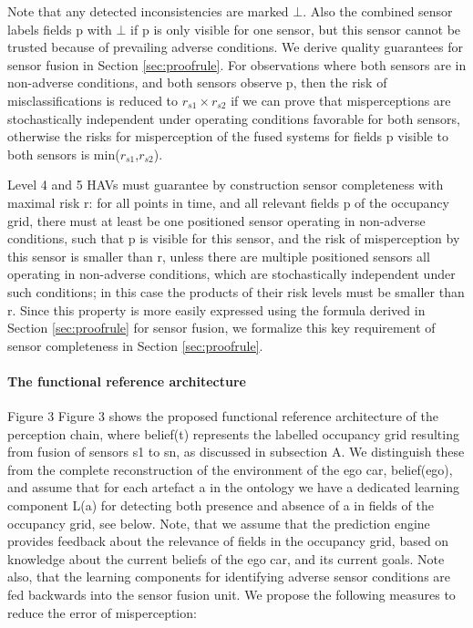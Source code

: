 Note that any detected inconsistencies are marked $\bot$. Also the combined sensor labels fields p with $\bot$ if p is only visible for one sensor, but this sensor cannot be trusted because of prevailing adverse conditions. We derive quality guarantees for sensor fusion in Section \ref{sec:proofrule}. For observations where both sensors are in non-adverse conditions, and both sensors observe p, then the risk of misclassifications is reduced to $r_{s1} \times r_{s2}$ if we can prove that misperceptions are stochastically independent under operating conditions favorable for both sensors, otherwise the risks for misperception of the fused systems for fields p visible to both sensors is min($r_{s1}$,$r_{s2}$).

Level 4 and 5 HAVs must guarantee by construction sensor completeness with maximal risk r: for all points in time, and all relevant fields p of the occupancy grid, there must at least be one positioned sensor operating in non-adverse conditions, such that p is visible for this sensor, and the risk of misperception by this sensor is smaller than r, unless there are multiple positioned sensors all operating in non-adverse conditions, which are stochastically independent under such conditions; in this case the products of their risk levels must be smaller than r. Since this property is more easily expressed using the formula derived in Section \ref{sec:proofrule} for sensor fusion, we formalize this key requirement of sensor completeness in Section \ref{sec:proofrule}.

\paragraph{The functional reference architecture}


Figure 3
Figure 3 shows the proposed functional reference architecture of the perception chain, where belief(t) represents the labelled occupancy grid resulting from fusion of sensors s1 to sn, as discussed in subsection A. We distinguish these from the complete reconstruction of the environment of the ego car, belief(ego), and assume that for each artefact  a in the ontology we have a dedicated learning component  L(a) for detecting both presence and absence of a in fields of the occupancy grid, see below. Note, that we assume that the prediction engine provides feedback about the relevance of fields in the occupancy grid, based on knowledge about the current beliefs of the ego car, and its current goals. Note also, that the learning components for identifying adverse sensor conditions are fed backwards into the sensor fusion unit. We propose the following measures to reduce the error of misperception:

